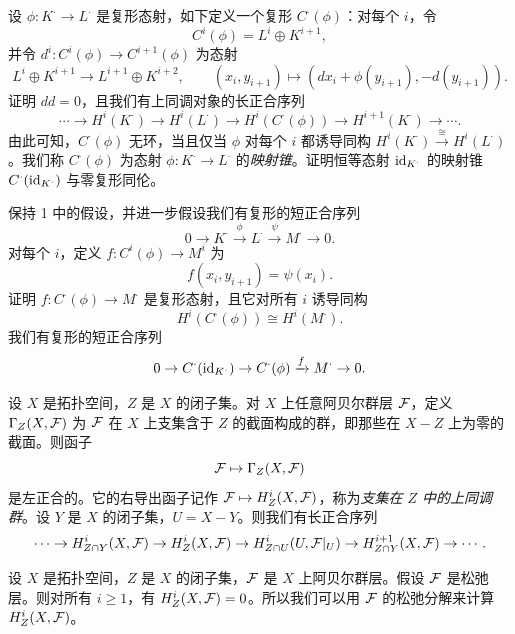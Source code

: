 \begin{exercises}
\item \label{ex:2.1.1} 设 $\phi\colon K^\cdot\to L^\cdot$ 是复形态射，如下定义一个复形 $C^\cdot(\phi)$：对每个 $i$，令
\[
C^i(\phi)=L^i\oplus K^{i+1},
\]
并令 $d^i\colon C^i(\phi)\to C^{i+1}(\phi)$ 为态射
\[
L^i\oplus K^{i+1}\to L^{i+1}\oplus K^{i+2},\qquad (x_i,y_{i+1})\mapsto(dx_i+\phi(y_{i+1}),-d(y_{i+1})).
\]
证明 $dd=0$，且我们有上同调对象的长正合序列
\[
\cdots\to H^i(K^\cdot)\to H^i(L^\cdot)\to H^i(C^\cdot(\phi))\to H^{i+1}(K^\cdot)\to\cdots.
\]
由此可知，$C^\cdot(\phi)$ 无环，当且仅当 $\phi$ 对每个 $i$ 都诱导同构 $H^i(K^\cdot)\xrightarrow{\cong}H^i(L^\cdot)$。我们称 $C^\cdot(\phi)$ 为态射 $\phi\colon K^\cdot\to L^\cdot$ 的\emph{映射锥}。证明恒等态射 $\operatorname{id}_{K^\cdot}$ 的映射锥 $C^\cdot(\operatorname{id}_{K^\cdot})$ 与零复形同伦。

\item \label{ex:2.1.2} 保持 1 中的假设，并进一步假设我们有复形的短正合序列
\[
0\to K^\cdot\xrightarrow{\phi}L^\cdot\xrightarrow{\psi}M^\cdot\to0.
\]
对每个 $i$，定义 $f\colon C^i(\phi)\to M^i$ 为
\[
f(x_i,y_{i+1})=\psi(x_i).
\]
证明 $f\colon C^\cdot(\phi)\to M^\cdot$ 是复形态射，且它对所有 $i$ 诱导同构
\[
H^i(C^\cdot(\phi))\cong H^i(M^\cdot).
\]
我们有复形的短正合序列
\[
0\to C^\cdot(\operatorname{id}_{K^\cdot})\to C^\cdot(\phi)\xrightarrow{f}M^\cdot\to0.
\]

\item \label{ex:2.1.3} 设 $X$ 是拓扑空间，$Z$ 是 $X$ 的闭子集。对 $X$ 上任意阿贝尔群层 $\mathcal{F}$，定义 $\Gamma_Z(X,\mathcal{F})$ 为 $\mathcal{F}$ 在 $X$ 上支集含于 $Z$ 的截面构成的群，即那些在 $X-Z$ 上为零的截面。则函子
\[
\mathcal{F}\mapsto\Gamma_Z(X,\mathcal{F})
\]
是左正合的。它的右导出函子记作 $\mathcal{F}\mapsto H^i_Z(X,\mathcal{F})$，称为\emph{支集在 $Z$ 中的上同调群}。设 $Y$ 是 $X$ 的闭子集，$U=X-Y$。则我们有长正合序列
\[
\cdots\to H^i_{Z\cap Y}(X,\mathcal{F})\to H^i_Z(X,\mathcal{F})\to H^i_{Z\cap U}(U,\mathcal{F}|_U)\to H^{i+1}_{Z\cap Y}(X,\mathcal{F})\to\cdots.
\]

\item \label{ex:2.1.4} 设 $X$ 是拓扑空间，$Z$ 是 $X$ 的闭子集，$\mathcal{F}$ 是 $X$ 上阿贝尔群层。假设 $\mathcal{F}$ 是松弛层。则对所有 $i\ge1$，有 $H^i_Z(X,\mathcal{F})=0$。所以我们可以用 $\mathcal{F}$ 的松弛分解来计算 $H^i_Z(X,\mathcal{F})$。
\end{exercises}
